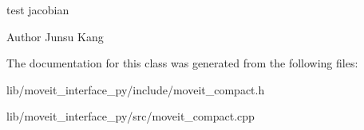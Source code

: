 test jacobian 

\begin{DoxyAuthor}{Author}
Junsu Kang 
\end{DoxyAuthor}


The documentation for this class was generated from the following files\+:\begin{DoxyCompactItemize}
\item 
lib/moveit\+\_\+interface\+\_\+py/include/moveit\+\_\+compact.\+h\item 
lib/moveit\+\_\+interface\+\_\+py/src/moveit\+\_\+compact.\+cpp\end{DoxyCompactItemize}
